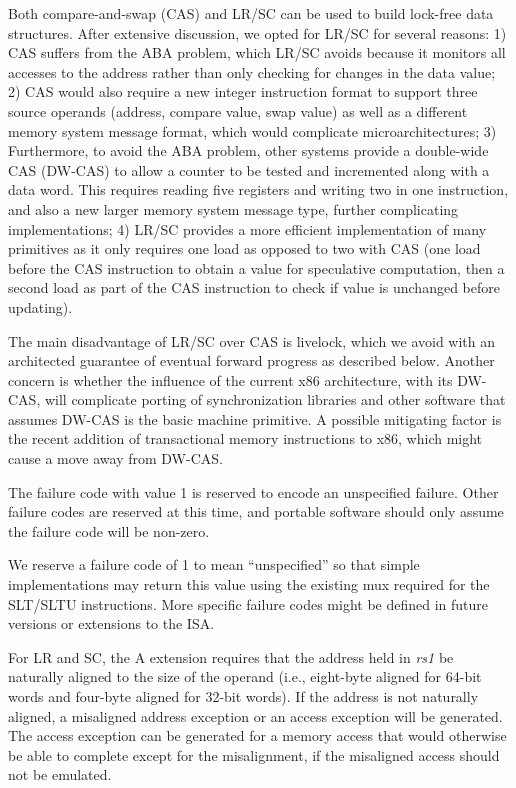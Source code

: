 \begin{commentary}
Both compare-and-swap (CAS) and LR/SC can be used to build lock-free
data structures.  After extensive discussion, we opted for LR/SC for
several reasons: 1) CAS suffers from the ABA problem, which LR/SC
avoids because it monitors all accesses to the address rather than
only checking for changes in the data value; 2) CAS would also require
a new integer instruction format to support three source operands
(address, compare value, swap value) as well as a different memory
system message format, which would complicate microarchitectures; 3)
Furthermore, to avoid the ABA problem, other systems provide a
double-wide CAS (DW-CAS) to allow a counter to be tested and
incremented along with a data word. This requires reading five
registers and writing two in one instruction, and also a new larger
memory system message type, further complicating implementations; 4)
LR/SC provides a more efficient implementation of many primitives as
it only requires one load as opposed to two with CAS (one load before
the CAS instruction to obtain a value for speculative computation,
then a second load as part of the CAS instruction to check if value is
unchanged before updating).

The main disadvantage of LR/SC over CAS is livelock, which we avoid
with an architected guarantee of eventual forward progress as
described below.  Another concern is whether the influence of the
current x86 architecture, with its DW-CAS, will complicate porting of
synchronization libraries and other software that assumes DW-CAS is
the basic machine primitive.  A possible mitigating factor is the
recent addition of transactional memory instructions to x86, which
might cause a move away from DW-CAS.
\end{commentary}

The failure code with value 1 is reserved to encode an unspecified
failure.  Other failure codes are reserved at this time, and portable
software should only assume the failure code will be non-zero.

\begin{commentary}
We reserve a failure code of 1 to mean ``unspecified'' so that simple
implementations may return this value using the existing mux required
for the SLT/SLTU instructions.  More specific failure codes might be
defined in future versions or extensions to the ISA.
\end{commentary}

For LR and SC, the A extension requires that the address held in {\em
  rs1} be naturally aligned to the size of the operand (i.e.,
eight-byte aligned for 64-bit words and four-byte aligned for 32-bit
words).  If the address is not naturally aligned, a misaligned address
exception or an access exception will be generated.  The access
exception can be generated for a memory access that would otherwise be
able to complete except for the misalignment, if the misaligned access
should not be emulated.

